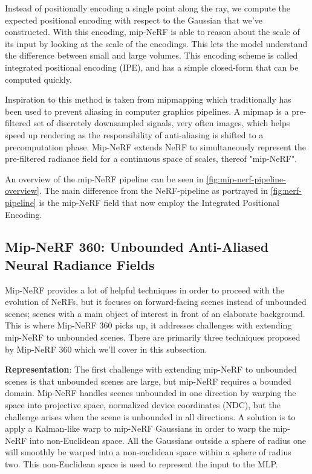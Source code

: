 Instead of positionally encoding a single point along the ray, we compute the expected positional encoding with respect to the Gaussian that we've constructed. With this encoding, mip-NeRF is able to reason about the scale of its input by looking at the scale of the encodings. This lets the model understand the difference between small and large volumes. This encoding scheme is called integrated positional encoding (IPE), and has a simple closed-form that can be computed quickly.

Inspiration to this method is taken from mipmapping which traditionally has been used to prevent aliasing in computer graphics pipelines. A mipmap is a pre-filtered set of discretely downsampled signals, very often images, which helps speed up rendering as the responsibility of anti-aliasing is shifted to a precomputation phase. Mip-NeRF extends NeRF to simultaneously represent the pre-filtered radiance field for a continuous space of scales, thereof "mip-NeRF".

An overview of the mip-NeRF pipeline can be seen in \autoref{fig:mip-nerf-pipeline-overview}. The main difference from the NeRF-pipeline as portrayed in \autoref{fig:nerf-pipeline} is the mip-NeRF field that now employ the Integrated Positional Encoding.





\subsection{Mip-NeRF 360: Unbounded Anti-Aliased Neural Radiance Fields} \label{sec:mipnerf360}
Mip-NeRF provides a lot of helpful techniques in order to proceed with the evolution of NeRFs, but it focuses on forward-facing scenes instead of unbounded scenes; scenes with a main object of interest in front of an elaborate background. This is where Mip-NeRF 360 \cite{barron_mip-nerf_2022} picks up, it addresses challenges with extending mip-NeRF to unbounded scenes. There are primarily three techniques proposed by Mip-NeRF 360 which we'll cover in this subsection.

\textbf{Representation}:
The first challenge with extending mip-NeRF to unbounded scenes is that unbounded scenes are large, but mip-NeRF requires a bounded domain. Mip-NeRF handles scenes unbounded in one direction by warping the space into projective space, normalized device coordinates (NDC), but the challenge arises when the scene is unbounded in all directions. A solution is to apply a Kalman-like warp to mip-NeRF Gaussians in order to warp the mip-NeRF into non-Euclidean space. All the Gaussians outside a sphere of radius one will smoothly be warped into a non-euclidean space within a sphere of radius two. This non-Euclidean space is used to represent the input to the MLP. 


